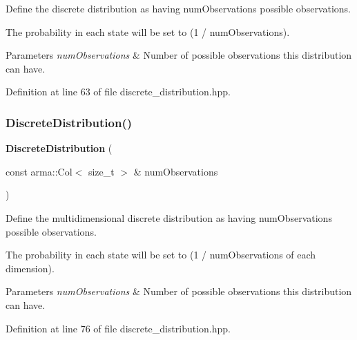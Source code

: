 Define the discrete distribution as having num\+Observations possible observations. 

The probability in each state will be set to (1 / num\+Observations).


\begin{DoxyParams}{Parameters}
{\em num\+Observations} & Number of possible observations this distribution can have. \\
\hline
\end{DoxyParams}


Definition at line 63 of file discrete\+\_\+distribution.\+hpp.

\mbox{\label{classmlpack_1_1distribution_1_1DiscreteDistribution_ad61f6ecc3bc550bdff56da47871813b5}} 
\subsubsection{Discrete\+Distribution()\hspace{0.1cm}{\footnotesize\ttfamily [3/4]}}
{\footnotesize\ttfamily \textbf{ Discrete\+Distribution} (\begin{DoxyParamCaption}\item[{const arma\+::\+Col$<$ size\+\_\+t $>$ \&}]{num\+Observations }\end{DoxyParamCaption})\hspace{0.3cm}{\ttfamily [inline]}}



Define the multidimensional discrete distribution as having num\+Observations possible observations. 

The probability in each state will be set to (1 / num\+Observations of each dimension).


\begin{DoxyParams}{Parameters}
{\em num\+Observations} & Number of possible observations this distribution can have. \\
\hline
\end{DoxyParams}


Definition at line 76 of file discrete\+\_\+distribution.\+hpp.

\mbox{\label{classmlpack_1_1distribution_1_1DiscreteDistribution_ac11a63ab01caa525fede366a32f0371d}} 
